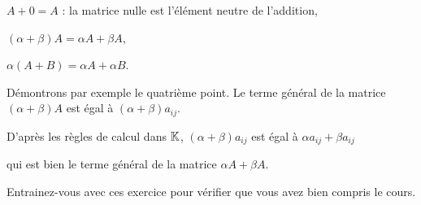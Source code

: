 \change
 $A + 0 = A$ : la matrice nulle est l'élément neutre de l'addition,

\change
 $(\alpha + \beta )A =\alpha A + \beta A$,
    
\change 
$\alpha (A+B)=\alpha A + \alpha B$.

\change
Démontrons par exemple le quatrième point. Le terme général de la matrice $(\alpha + \beta ) A $ est égal à 
$(\alpha + \beta)a_{ij}$. 

\change
D'après les règles de calcul dans $\mathbb{K}$,  $(\alpha + \beta)a_{ij}$ est égal à  $\alpha a_{ij}+ \beta a_{ij}$

\change
qui est bien le terme général de la matrice $\alpha A + \beta A$.


\diapo

Entrainez-vous avec ces exercice pour vérifier que vous avez bien compris le cours.


